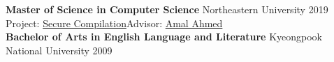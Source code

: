 \documentclass[margin,line]{resume}
\newcommand\mymedskip{10pt}
\begin{document}
\begin{resume}
    \textbf{Master of Science in Computer Science} \hfill Northeastern University 2019\\
    Project: \href{https://arxiv.org/abs/1204.4305}{Secure Compilation}\hfill Advisor: \href{https://www.khoury.northeastern.edu/home/amal/}{Amal Ahmed}\\[\mymedskip]
    \textbf{Bachelor of Arts in English Language and Literature}  \hfill Kyeongpook National University 2009  %
    


\end{resume}
\end{document}

